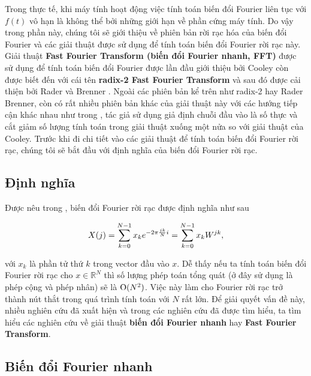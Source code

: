 		Trong thực tế, khi máy tính hoạt động việc tính toán biến đổi Fourier liên tục với $f(t)$ vô hạn là không thể bởi những giới hạn về phần cứng máy tính. Do vậy trong phần này, chúng tôi sẽ giới thiệu về phiên bản rời rạc hóa của biến đổi Fourier và các giải thuật được sử dụng để tính toán biến đổi Fourier rời rạc này. Giải thuật \textbf{Fast Fourier Transform (biến đổi Fourier nhanh, FFT)} được sử dụng để tính toán biến đổi Fourier được lần đầu giới thiệu bởi Cooley \cite{fft_cooley} còn được biết đến với cái tên \textbf{radix-2 Fast Fourier Transform} và sau đó được cải thiện bởi Rader và Brenner \cite{fft_rader_brenner, fft_springer_nuss}. Ngoài các phiên bản kể trên như radix-2 hay Rader Brenner, còn có rất nhiều phiên bản khác của giải thuật này với các hướng tiếp cận khác nhau như trong \cite{fft_bergland}, tác giả sử dụng giả định chuỗi đầu vào là số thực và cắt giảm số lượng tính toán trong giải thuật xuống một nửa so với giải thuật của Cooley. Trước khi đi chi tiết vào các giải thuật để tính toán biến đổi Fourier rời rạc, chúng tôi sẽ bắt đầu với định nghĩa của biến đổi Fourier rời rạc.
	
		\subsection{Định nghĩa}\label{subsection::signal_processing::dft::def}
		
			Được nêu trong \cite{mdft}, biến đổi Fourier rời rạc được định nghĩa như sau
			
				\begin{equation}
					X(j) = \sum_{k=0}^{N - 1} x_ke^{-2\pi \frac{j k}{N}i} = \sum_{k=0}^{N - 1} x_k W^{jk},
					\label{dft::dftformula}
				\end{equation}
			
			\noindent với $x_k$ là phần tử thứ $k$ trong vector đầu vào $x$. Dễ thấy nếu ta tính toán biến đổi Fourier rời rạc cho $x \in \mathbb{R}^N$ thì số lượng phép toán tổng quát (ở đây sử dụng là phép cộng và phép nhân) sẽ là $\text{O}(N^2)$. Việc này làm cho Fourier rời rạc trở thành nút thắt trong quá trình tính toán với $N$ rất lớn. Để giải quyết vấn đề này, nhiều nghiên cứu đã xuất hiện và trong các nghiên cứu đã được tìm hiểu, ta tìm hiểu các nghiên cứu về giải thuật \textbf{biến đổi Fourier nhanh} hay \textbf{Fast Fourier Transform}.
		
		\subsection{Biến đổi Fourier nhanh}\label{subsection::signal_processing::dft::fft}
		
